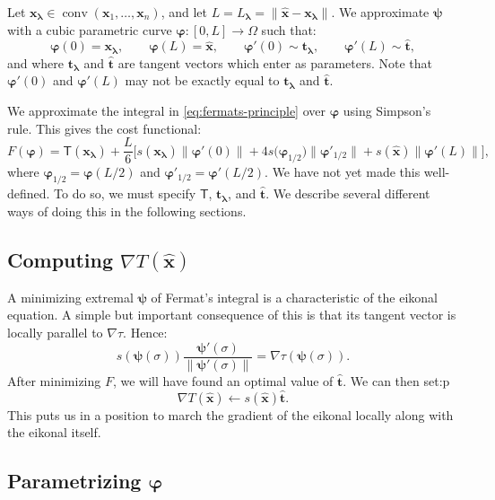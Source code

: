\documentclass{siamart190516}
\renewcommand{\phi}{\varphi}
\newcommand{\m}[1]{\boldsymbol{#1}}
\newcommand{\xhat}{\hat{\m{x}}}
\newcommand{\xlam}{\m{x}_{\m{\lambda}}}
\newcommand{\that}{\hat{\m{t}}}
\newcommand{\tlam}{\m{t}_{\m{\lambda}}}
\newcommand{\half}{1/2}
\newcommand{\mphi}{\m{\phi}}
\newcommand{\mpsi}{\m{\psi}}
\DeclareMathOperator{\conv}{conv}
\begin{document}
Let $\m{x}_{\m{\lambda}} \in \conv(\m{x}_1, \hdots, \m{x}_n)$, and let
$L = L_{\m{\lambda}} = \|\hat{\m{x}} - \m{x}_{\m{\lambda}}\|$. We
approximate $\mpsi$ with a cubic parametric curve
$\mphi : [0, L] \to \Omega$ such that:
\begin{equation}
  \mphi(0) = \xlam, \qquad \mphi(L) = \xhat, \qquad \mphi'(0) \sim \tlam, \qquad \mphi'(L) \sim \that,
\end{equation}
and where $\tlam$ and $\that$ are tangent vectors which enter as
parameters. Note that $\mphi'(0)$ and $\mphi'(L)$ may not be exactly
equal to $\tlam$ and $\that$.

We approximate the integral in \eqref{eq:fermats-principle} over
$\mphi$ using Simpson's rule. This gives the cost functional:
\begin{equation}\label{eq:general-cost-function}
  F(\mphi) = \mathsf{T}(\xlam) + \frac{L}{6}\Big[s(\xlam)\|\mphi'(0)\| + 4 s\big(\mphi_{\half}\big)\big\|\mphi'_{\half}\big\| + s(\xhat)\|\mphi'(L)\|\Big],
\end{equation}
where $\mphi_{\half} = \mphi(L/2)$ and
$\mphi'_{\half} = \mphi'(L/2)$.  We have not yet made this
well-defined. To do so, we must specify $\mathsf{T}$, $\tlam$, and
$\that$. We describe several different ways of doing this in the
following sections.

\subsection{Computing $\nabla T(\xhat)$}

A minimizing extremal $\mpsi$ of Fermat's integral is a characteristic
of the eikonal equation. A simple but important consequence of this is
that its tangent vector is locally parallel to $\nabla \tau$. Hence:
\begin{equation}
  s(\mpsi(\sigma)) \frac{\mpsi'(\sigma)}{\|\mpsi'(\sigma)\|} = \nabla \tau(\mpsi(\sigma)).
\end{equation}
After minimizing $F$, we will have found an optimal value of
$\that$. We can then set:p
\begin{equation}
  \nabla T(\xhat) \gets s(\xhat) \that.
\end{equation}
This puts us in a position to march the gradient of the eikonal
locally along with the eikonal itself.

\subsection{Parametrizing $\mphi$}
\end{document}
